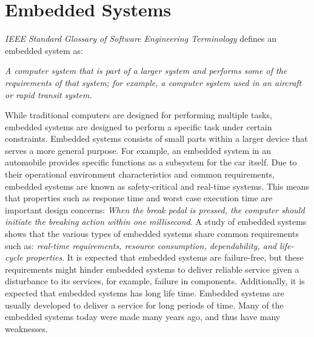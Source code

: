 			

\section{Embedded Systems}

\textit{IEEE Standard Glossary of Software Engineering Terminology}\cite{radatz1990ieee} defines an embedded system as:
\begin{displayquote}
	\textit{A computer system that is part of a larger system and performs some of the requirements of that system; for example, a computer system used in an aircraft or rapid transit system.}
\end{displayquote}

While traditional computers are designed for performing multiple tasks, embedded systems are designed to perform a specific task under certain constraints. Embedded systems consists of small parts within a larger device that serves a more general purpose. For example, an embedded system in an automobile provides specific functions as a subsystem for the car itself\cite{Crnkovic:2005:CSE:1062455.1062631}. Due to their operational environment characteristics and common requirements, embedded systems are known as safety-critical and real-time systems\cite{563572,Crnkovic:2005:CSE:1062455.1062631}. This means that properties such as response time and worst case execution time are important design concerns\cite{4519555}: \textit{When the break pedal is pressed, the computer should initiate the breaking action within one millisecond}. A study of embedded systems shows that the various types of embedded systems share common requirements such as: \textit{real-time requirements, resource consumption, dependability, and life-cycle properties}\cite{crnkovic2004component}. It is expected that embedded systems are failure-free\cite{you2013reliability}, but these requirements might hinder embedded systems to deliver reliable service given a disturbance to its services, for example, failure in components\cite{patil2009embedded}. Additionally, it is expected that embedded systems has long life time\cite{563572}. Embedded systems are usually developed to deliver a service for long periods of time. Many of the embedded systems today were made many years ago, and thus have many weaknesses. 

